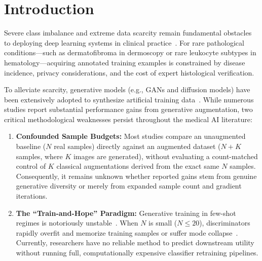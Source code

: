 \documentclass[runningheads]{llncs}
\begin{document}
\section{Introduction}
\label{sec:intro}
Severe class imbalance and extreme data scarcity remain fundamental obstacles to deploying deep learning systems in clinical practice~\cite{yang2023medmnist,tschandl2018ham10000}. For rare pathological conditions---such as dermatofibroma in dermoscopy or rare leukocyte subtypes in hematology---acquiring annotated training examples is constrained by disease incidence, privacy considerations, and the cost of expert histological verification.

To alleviate scarcity, generative models (e.g., GANs and diffusion models) have been extensively adopted to synthesize artificial training data~\cite{fridadar2018gan,waheed2020covidgan,skandarani2023gans}. While numerous studies report substantial performance gains from generative augmentation, two critical methodological weaknesses persist throughout the medical AI literature:
\begin{enumerate}
    \item \textbf{Confounded Sample Budgets:} Most studies compare an unaugmented baseline ($N$ real samples) directly against an augmented dataset ($N + K$ samples, where $K$ images are generated), without evaluating a count-matched control of $K$ classical augmentations derived from the exact same $N$ samples. Consequently, it remains unknown whether reported gains stem from genuine generative diversity or merely from expanded sample count and gradient iterations.
    \item \textbf{The ``Train-and-Hope'' Paradigm:} Generative training in few-shot regimes is notoriously unstable~\cite{zhao2020diffaugment}. When $N$ is small ($N \le 20$), discriminators rapidly overfit and memorize training samples or suffer mode collapse~\cite{bissoto2021skin}. Currently, researchers have no reliable method to predict downstream utility without running full, computationally expensive classifier retraining pipelines.
\end{enumerate}
\end{document}
